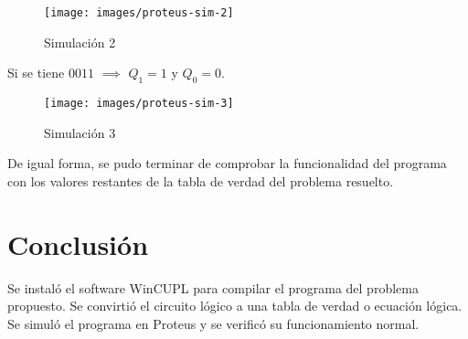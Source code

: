 \documentclass{article}
\begin{document}
    \begin{figure}[H]
        \centering
        \texttt{[image: images/proteus-sim-2]}
        \caption{Simulación 2}
    \end{figure}

    \bigbreak

    Si se tiene $0011$ $\implies$ $Q_1 = 1$ y $Q_0 = 0$.

    \begin{figure}[H]
        \centering
        \texttt{[image: images/proteus-sim-3]}
        \caption{Simulación 3}
    \end{figure}

    De igual forma, se pudo terminar de comprobar la funcionalidad del
    programa con los valores restantes de la tabla de verdad del problema
    resuelto.

    \section{Conclusión}\label{sec:conclusion}

    Se instaló el software WinCUPL para compilar el programa del problema
    propuesto. Se convirtió el circuito lógico a una tabla de verdad o
    ecuación lógica. Se simuló el programa en Proteus y se verificó su
    funcionamiento normal.

    \printbibliography
\end{document}
